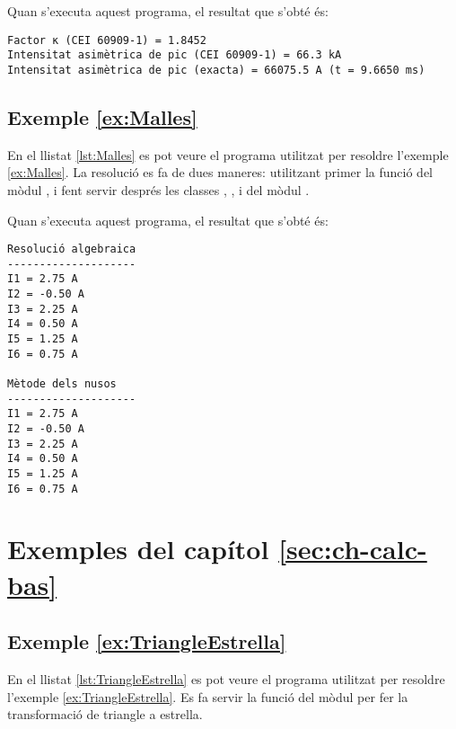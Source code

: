 Quan s'executa aquest programa, el resultat que s'obté és:
\lstset{
	language=,
	numbers=none,
	frame=none
}
\begin{lstlisting}
Factor κ (CEI 60909-1) = 1.8452
Intensitat asimètrica de pic (CEI 60909-1) = 66.3 kA
Intensitat asimètrica de pic (exacta) = 66075.5 A (t = 9.6650 ms)
\end{lstlisting}


\hypertarget{exemple:Malles}{\subsection{Exemple \ref*{ex:Malles} \Malles}}
En el llistat \vref{lst:Malles} es pot veure el programa utilitzat per resoldre l'exemple \vref{ex:Malles}. La resolució es fa de dues maneres: utilitzant primer la funció  del mòdul , i fent servir després les classes , , i  del mòdul .


Quan s'executa aquest programa, el resultat que s'obté és:
\lstset{
	language=,
	numbers=none,
	frame=none
}
\begin{lstlisting}
Resolució algebraica
--------------------
I1 = 2.75 A
I2 = -0.50 A
I3 = 2.25 A
I4 = 0.50 A
I5 = 1.25 A
I6 = 0.75 A

Mètode dels nusos
--------------------
I1 = 2.75 A
I2 = -0.50 A
I3 = 2.25 A
I4 = 0.50 A
I5 = 1.25 A
I6 = 0.75 A
\end{lstlisting} 



\section{Exemples del capítol \ref*{sec:ch-calc-bas}}

\hypertarget{exemple:TriangleEstrella}{\subsection{Exemple \ref*{ex:TriangleEstrella} \TriangleEstrella}}
En el llistat \vref{lst:TriangleEstrella} es pot veure el programa utilitzat per resoldre l'exemple \vref{ex:TriangleEstrella}. Es fa servir la funció  del mòdul  per fer la transformació de triangle a estrella.


